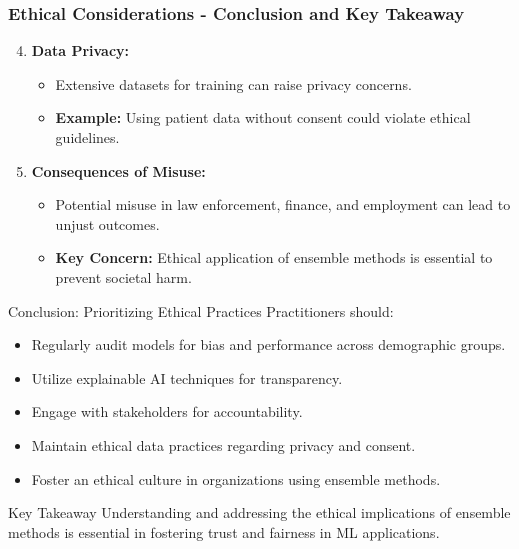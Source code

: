 \documentclass[aspectratio=169]{beamer}
\begin{document}
\begin{frame}[fragile]
    \frametitle{Ethical Considerations - Conclusion and Key Takeaway}
    \begin{enumerate}
        \setcounter{enumi}{3}
        \item \textbf{Data Privacy:}
            \begin{itemize}
                \item Extensive datasets for training can raise privacy concerns.\newline
                \item \textbf{Example:} Using patient data without consent could violate ethical guidelines.
            \end{itemize}

        \item \textbf{Consequences of Misuse:}
            \begin{itemize}
                \item Potential misuse in law enforcement, finance, and employment can lead to unjust outcomes.
                \item \textbf{Key Concern:} Ethical application of ensemble methods is essential to prevent societal harm.
            \end{itemize}
    \end{enumerate}
    
    \begin{block}{Conclusion: Prioritizing Ethical Practices}
        Practitioners should:
        \begin{itemize}
            \item Regularly audit models for bias and performance across demographic groups.
            \item Utilize explainable AI techniques for transparency.
            \item Engage with stakeholders for accountability.
            \item Maintain ethical data practices regarding privacy and consent.
            \item Foster an ethical culture in organizations using ensemble methods.
        \end{itemize}
    \end{block}
    
    \begin{block}{Key Takeaway}
        Understanding and addressing the ethical implications of ensemble methods is essential in fostering trust and fairness in ML applications.
    \end{block}
\end{frame}
\end{document}
